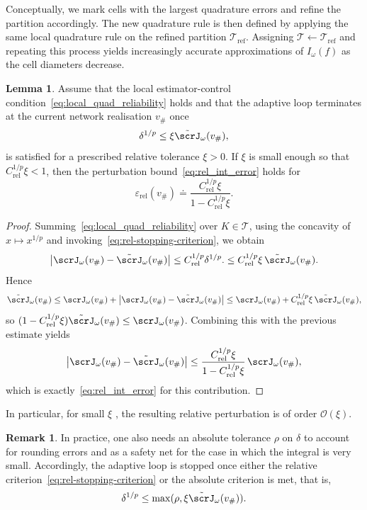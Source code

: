 \documentclass[oneside,reqno,11pt,a4paper]{amsart}
\theoremstyle{definition}
\newtheorem{remark}{Remark}[section]
\newtheorem{lemma}{Lemma}[section]
\newcommand{\abs}[1]{\left\lvert#1\right\rvert}
\begin{document}
Conceptually, we mark cells with the largest quadrature errors and refine the
partition accordingly. The new quadrature rule is then defined by applying the
same local quadrature rule on the refined partition
$\mathcal{T}_{\mathrm{ref}}$. Assigning $\mathcal{T} \leftarrow
\mathcal{T}_{\mathrm{ref}}$ and repeating this process yields increasingly
accurate approximations of $I_\omega(f)$ as the cell diameters decrease. 
\begin{lemma}\label{lemma:A1prime-implies-A1}
Assume that the local estimator-control condition~\eqref{eq:local_quad_reliability}
holds and that the adaptive loop terminates at the current network realisation
$v_{\#}$ once
\begin{equation}\label{eq:rel-stopping-criterion}
\delta^{1/p} \leq \xi \tilde \scrJ_\omega(v_{\#}),
\end{equation}
is satisfied for a prescribed relative tolerance $\xi > 0$. If $\xi$ is small enough so that $C_{\mathrm{rel}}^{1/p}\xi < 1$, then the perturbation bound~\eqref{eq:rel_int_error} holds for 
\[
\varepsilon_{\mathrm{rel}}(v_{\#})
\doteq
\frac{C_{\mathrm{rel}}^{1/p}\xi}{1-C_{\mathrm{rel}}^{1/p}\xi}.
\]
\end{lemma}
\begin{proof}
Summing~\eqref{eq:local_quad_reliability} over $K \in \mathcal{T}$, using
the concavity of $x \mapsto x^{1/p}$ and invoking~\eqref{eq:rel-stopping-criterion}, we obtain
\[
\abs{\scrJ_\omega(v_{\#})-\tilde \scrJ_\omega(v_{\#})}
\leq
C_{\mathrm{rel}}^{1/p}\delta^{1/p}.
\leq
C_{\mathrm{rel}}^{1/p}\xi\,\tilde \scrJ_\omega(v_{\#}).
\]
Hence
\[
\tilde \scrJ_\omega(v_{\#})
\leq
\scrJ_\omega(v_{\#})
+
\abs{\scrJ_\omega(v_{\#})-\tilde \scrJ_\omega(v_{\#})}
\leq
\scrJ_\omega(v_{\#})
+
C_{\mathrm{rel}}^{1/p}\xi\,\tilde \scrJ_\omega(v_{\#}),
\]
so $(1-C_{\mathrm{rel}}^{1/p}\xi)\tilde \scrJ_\omega(v_{\#}) \le \scrJ_\omega(v_{\#})$.
Combining this with the previous estimate yields
\[
\abs{\scrJ_\omega(v_{\#})-\tilde \scrJ_\omega(v_{\#})}
\leq
\frac{C_{\mathrm{rel}}^{1/p}\xi}{1-C_{\mathrm{rel}}^{1/p}\xi}\,\scrJ_\omega(v_{\#}),
\]
which is exactly~\eqref{eq:rel_int_error} for this contribution.
\end{proof}
In particular, for small $\xi$ , the resulting relative perturbation is of order $\mathcal{O}(\xi)$.
\begin{remark}
In practice, one also needs an absolute tolerance $\rho$ on $\delta$ to account
for rounding errors and as a safety net for the case in which the integral is
very small. Accordingly, the adaptive loop is stopped once either the relative
criterion~\eqref{eq:rel-stopping-criterion} or the absolute criterion is met,
that is,
\begin{equation}\label{eq:abs-stopping-criterion}
\delta^{1/p} \leq \max(\rho, \xi \tilde \scrJ_\omega(v_{\#})).
\end{equation}
\end{remark}
\end{document}
